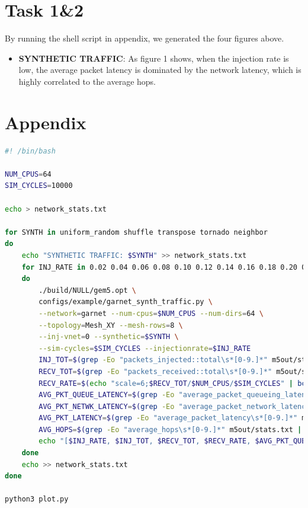 \documentclass{article}
\begin{document}
\section*{Task 1\&2}
By running the shell script in appendix, we generated the four figures above.\begin{itemize}
    \item \textbf{SYNTHETIC TRAFFIC}: As figure 1 shows, when the injection rate is low, the average packet latency is dominated by the network latency, which is highly correlated to the average hops.
\end{itemize}


\section*{Appendix}
\begin{lstlisting}[language=bash]
#! /bin/bash

NUM_CPUS=64
SIM_CYCLES=10000

echo > network_stats.txt

for SYNTH in uniform_random shuffle transpose tornado neighbor
do
	echo "SYNTHETIC TRAFFIC: $SYNTH" >> network_stats.txt
	for INJ_RATE in 0.02 0.04 0.06 0.08 0.10 0.12 0.14 0.16 0.18 0.20 0.22 0.24 0.26 0.28 0.30 0.32 0.34 0.36 0.38 0.40 0.42 0.44 0.46 0.48 0.50 0.52 0.54 0.56 0.58 0.60 0.62 0.64 0.66 0.68 0.70 0.72 0.74 0.76 0.78 0.80
	do
		./build/NULL/gem5.opt \
		configs/example/garnet_synth_traffic.py \
		--network=garnet --num-cpus=$NUM_CPUS --num-dirs=64 \
		--topology=Mesh_XY --mesh-rows=8 \
		--inj-vnet=0 --synthetic=$SYNTH \
		--sim-cycles=$SIM_CYCLES --injectionrate=$INJ_RATE
		INJ_TOT=$(grep -Eo "packets_injected::total\s*[0-9.]*" m5out/stats.txt | grep -Eo "[0-9.]*")
		RECV_TOT=$(grep -Eo "packets_received::total\s*[0-9.]*" m5out/stats.txt | grep -Eo "[0-9.]*")
		RECV_RATE=$(echo "scale=6;$RECV_TOT/$NUM_CPUS/$SIM_CYCLES" | bc)
		AVG_PKT_QUEUE_LATENCY=$(grep -Eo "average_packet_queueing_latency\s*[0-9.]*" m5out/stats.txt | grep -Eo "[0-9.]*")
		AVG_PKT_NETWK_LATENCY=$(grep -Eo "average_packet_network_latency\s*[0-9.]*" m5out/stats.txt | grep -Eo "[0-9.]*")
		AVG_PKT_LATENCY=$(grep -Eo "average_packet_latency\s*[0-9.]*" m5out/stats.txt | grep -Eo "[0-9.]*")
		AVG_HOPS=$(grep -Eo "average_hops\s*[0-9.]*" m5out/stats.txt | grep -Eo "[0-9.]*")
		echo "[$INJ_RATE, $INJ_TOT, $RECV_TOT, $RECV_RATE, $AVG_PKT_QUEUE_LATENCY, $AVG_PKT_NETWK_LATENCY, $AVG_PKT_LATENCY, $AVG_HOPS]" >> network_stats.txt
	done
	echo >> network_stats.txt
done

python3 plot.py


\end{lstlisting}
\end{document}
